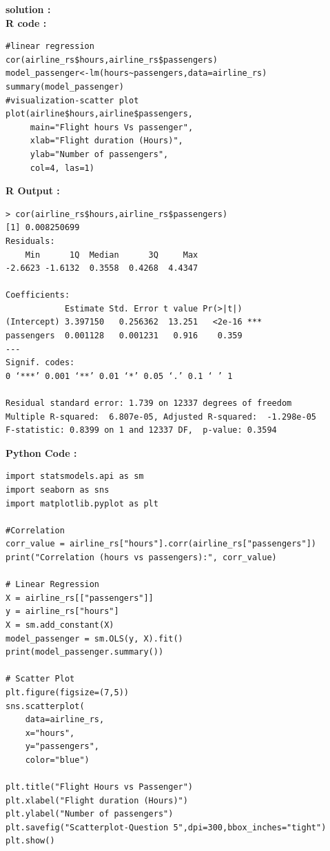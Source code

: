 \documentclass[11pt,a4paper]{article}
\begin{document}
\vspace{1em}
\newpage
\noindent \textbf{solution :}\\
\noindent\textbf{R code :}
\begin{codebox}
\begin{lstlisting}[style=Rstyle]
#linear regression
cor(airline_rs$hours,airline_rs$passengers)
model_passenger<-lm(hours~passengers,data=airline_rs)
summary(model_passenger)
#visualization-scatter plot
plot(airline$hours,airline$passengers,
     main="Flight hours Vs passenger",
     xlab="Flight duration (Hours)",
     ylab="Number of passengers",
     col=4, las=1)
\end{lstlisting}
\end{codebox}
\vspace{0.5em}
\noindent \textbf{R Output :}
\begin{verbatim}
> cor(airline_rs$hours,airline_rs$passengers)
[1] 0.008250699
Residuals:
    Min      1Q  Median      3Q     Max 
-2.6623 -1.6132  0.3558  0.4268  4.4347 

Coefficients:
            Estimate Std. Error t value Pr(>|t|)    
(Intercept) 3.397150   0.256362  13.251   <2e-16 ***
passengers  0.001128   0.001231   0.916    0.359    
---
Signif. codes:  
0 ‘***’ 0.001 ‘**’ 0.01 ‘*’ 0.05 ‘.’ 0.1 ‘ ’ 1

Residual standard error: 1.739 on 12337 degrees of freedom
Multiple R-squared:  6.807e-05,	Adjusted R-squared:  -1.298e-05 
F-statistic: 0.8399 on 1 and 12337 DF,  p-value: 0.3594
\end{verbatim}
\vspace{0.5em}
\newpage
\noindent \textbf{Python Code :}
\begin{codebox}
\begin{lstlisting}[style=Pythonstyle]
import statsmodels.api as sm
import seaborn as sns
import matplotlib.pyplot as plt

#Correlation
corr_value = airline_rs["hours"].corr(airline_rs["passengers"])
print("Correlation (hours vs passengers):", corr_value)

# Linear Regression
X = airline_rs[["passengers"]]
y = airline_rs["hours"]
X = sm.add_constant(X)
model_passenger = sm.OLS(y, X).fit()
print(model_passenger.summary())

# Scatter Plot
plt.figure(figsize=(7,5))
sns.scatterplot(
    data=airline_rs,
    x="hours",
    y="passengers",
    color="blue")

plt.title("Flight Hours vs Passenger")
plt.xlabel("Flight duration (Hours)")
plt.ylabel("Number of passengers")
plt.savefig("Scatterplot-Question 5",dpi=300,bbox_inches="tight")
plt.show()
\end{lstlisting}
\end{codebox}
\end{document}
